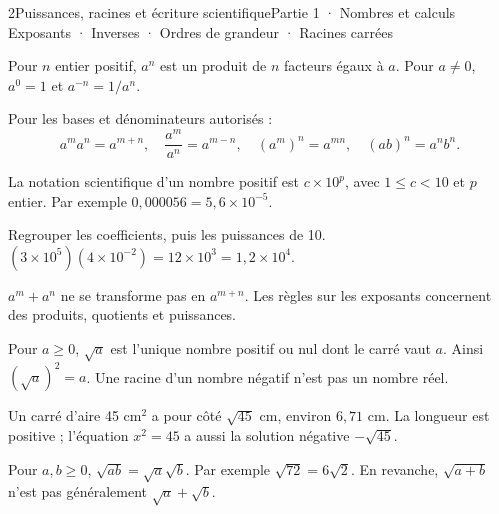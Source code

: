 \begin{ouverture}[courbe]{2}{Puissances, racines et écriture scientifique}{Partie 1 · Nombres et calculs}
{Exposants · Inverses · Ordres de grandeur · Racines carrées}
\end{ouverture}
\pagestyle{otMain}\essentiel\fontsize{11}{15}\selectfont
{}
\begin{definition}Pour $n$ entier positif, $a^n$ est un produit de $n$ facteurs égaux à $a$. Pour $a\ne0$, $a^0=1$ et $a^{-n}=1/a^n$.\end{definition}
\begin{propriete}Pour les bases et dénominateurs autorisés :
\[a^ma^n=a^{m+n},\quad \frac{a^m}{a^n}=a^{m-n},\quad
(a^m)^n=a^{mn},\quad (ab)^n=a^nb^n.\]\end{propriete}
\begin{definition}La notation scientifique d’un nombre positif est $c\times10^p$, avec $1\le c<10$ et $p$ entier. Par exemple $0{,}000056=5{,}6\times10^{-5}$.\end{definition}
\begin{savoirfaire}Regrouper les coefficients, puis les puissances de 10. $(3\times10^5)(4\times10^{-2})=12\times10^3=1{,}2\times10^4$.\end{savoirfaire}
\begin{attention}$a^m+a^n$ ne se transforme pas en $a^{m+n}$. Les règles sur les exposants concernent des produits, quotients et puissances.\end{attention}
\clearpage
{}
\begin{definition}Pour $a\ge0$, $\sqrt a$ est l’unique nombre positif ou nul dont le carré vaut $a$. Ainsi $(\sqrt a)^2=a$. Une racine d’un nombre négatif n’est pas un nombre réel.\end{definition}
\begin{exemple}Un carré d’aire 45 cm$^2$ a pour côté $\sqrt{45}$ cm, environ $6{,}71$ cm. La longueur est positive ; l’équation $x^2=45$ a aussi la solution négative $-\sqrt{45}$.\end{exemple}
\begin{propriete}Pour $a,b\ge0$, $\sqrt{ab}=\sqrt a\sqrt b$. Par exemple $\sqrt{72}=6\sqrt2$. En revanche, $\sqrt{a+b}$ n’est pas généralement $\sqrt a+\sqrt b$.\end{propriete}
